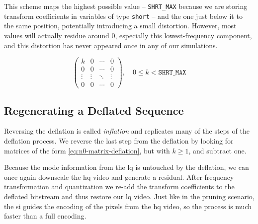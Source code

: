 This scheme maps the highest possible value -- \texttt{SHRT{\_}MAX} because we are storing transform coefficients in variables of type \texttt{short} -- and the one just below it to the same position, potentially introducing a small distortion. However, most values will actually residue around 0, especially this lowest-frequency component, and this distortion has never appeared once in any of our simulations.

\begin{equation}
\label{eq:n0-matrix-deflation}
\begin{pmatrix}
	k & 0 & \cdots & 0 \\
	0 & 0 & \cdots & 0 \\
	\vdots  & \vdots  & \ddots & \vdots \\
	0 & 0 & \cdots & 0
\end{pmatrix} , \quad 0 \leq k < \texttt{SHRT{\_}MAX}
\end{equation}

\subsection{Regenerating a Deflated Sequence}
Reversing the deflation is called \textit{inflation} and replicates many of the steps of the deflation process. We reverse the last step from the deflation by looking for matrices of the form \cref{eq:n0-matrix-deflation}, but with $k \geq 1$, and subtract one.

Because the mode information from the \gls{lq} is untouched by the deflation, we can once again downscale the \gls{hq} video and generate a residual. After frequency transformation and quantization we re-add the transform coefficients to the deflated bitstream and thus restore our \gls{lq} video. Just like in the pruning scenario, the \gls{si} guides the encoding of the pixels from the \gls{hq} video, so the process is much faster than a full encoding.